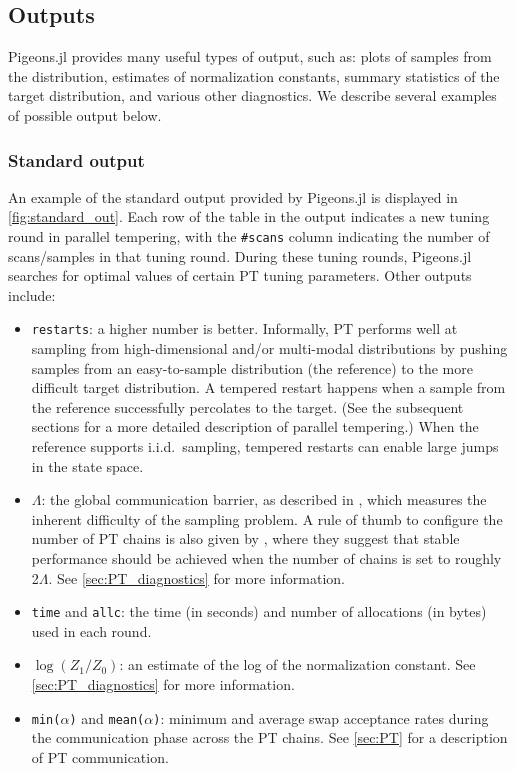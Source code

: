 \subsection{Outputs}
Pigeons.jl provides many useful types of output, such as: plots of samples from 
the distribution, estimates of normalization constants, summary statistics of 
the target distribution, and various other diagnostics. 
We describe several examples of possible output below.


\subsubsection{Standard output}
An example of the standard output provided by Pigeons.jl is displayed in \cref{fig:standard_out}. 
Each row of the table in the output indicates a new tuning round in parallel tempering, 
with the \texttt{\#scans} column indicating the number of scans/samples in 
that tuning round. 
During these tuning rounds, Pigeons.jl searches for optimal values of certain PT 
tuning parameters. Other outputs include: 
\begin{itemize}
    \item \texttt{restarts}: a higher number is better. 
    Informally, PT performs well at sampling from high-dimensional and/or multi-modal 
    distributions by pushing samples from an easy-to-sample distribution (the reference) 
    to the more difficult target distribution. 
    A tempered restart happens when a sample from the reference successfully 
    percolates to the target. (See the subsequent sections for a more detailed description 
    of parallel tempering.) 
    When the reference supports i.i.d.~sampling, tempered restarts 
    can enable large jumps in the state space. 

    \item \texttt{$\Lambda$}: the global communication barrier, as described in \cite{syed2021nrpt}, 
    which measures the inherent difficulty of the sampling problem.
    A rule of thumb to configure the number of PT chains is also 
    given by \cite{syed2021nrpt}, where they suggest that stable performance 
    should be achieved when the number of chains is set to roughly 2$\Lambda$.
    See \cref{sec:PT_diagnostics} for more information.

    \item \texttt{time} and \texttt{allc}: the time (in seconds) and number of 
    allocations (in bytes) used in each round.

    \item \texttt{$\log(Z_1/Z_0)$}: an estimate of the 
    log of the normalization constant. See \cref{sec:PT_diagnostics} for more information. 

    \item \texttt{min($\alpha$)} and \texttt{mean($\alpha$)}: minimum and average swap 
    acceptance rates during the communication phase across the PT chains.
    See \cref{sec:PT} for a description of PT communication.
\end{itemize}


